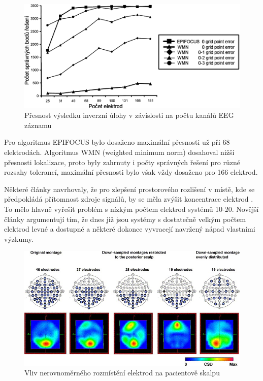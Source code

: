 \begin{figure}[!h]
\includegraphics[scale=0.6]{casti/teorie/chybyInverze.png}
\caption{Přesnost výsledku inverzní úlohy v závislosti na počtu kanálů EEG záznamu \cite{72}}
\end{figure}

Pro algoritmus EPIFOCUS bylo dosaženo maximální přesnosti už při 68 elektrodách. Algoritmus WMN (weighted minimum norm) dosahoval nižší přesnosti lokalizace, proto byly zahrnuty i počty správných řešení pro různé rozsahy tolerancí, maximální přesnosti bylo však vždy dosaženo pro 166 elektrod. \cite{33}

Některé články navrhovaly, že pro zlepšení prostorového rozlišení v místě, kde se předpokládá přítomnost zdroje signálů, by se měla zvýšit koncentrace elektrod \cite{34}. To mělo hlavně vyřešit problém s nízkým počtem elektrod systémů 10-20. Novější články argumentují tím, že dnes již jsou systémy s dostatečně velkým počtem elektrod levné a dostupné a některé dokonce vyvracejí navržený nápad vlastními výzkumy.

\begin{figure}[!h]
\includegraphics[width=1.0\textwidth]{casti/teorie/rozlozeniElektrod.jpg}
\caption{Vliv nerovnoměrného rozmístění elektrod na pacientově skalpu \cite{73}}
\end{figure}

